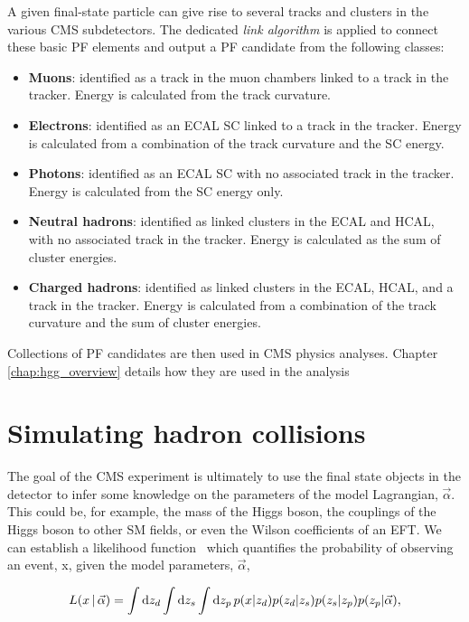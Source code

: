 A given final-state particle can give rise to several tracks and clusters in the various CMS subdetectors. The dedicated \textit{link algorithm} is applied to connect these basic PF elements and output a PF candidate from the following classes:
\begin{itemize}
    \item \textbf{Muons}: identified as a track in the muon chambers linked to a track in the tracker. Energy is calculated from the track curvature.
    \item \textbf{Electrons}: identified as an ECAL SC linked to a track in the tracker. Energy is calculated from a combination of the track curvature and the SC energy. 
    \item \textbf{Photons}: identified as an ECAL SC with no associated track in the tracker. Energy is calculated from the SC energy only.
    \item \textbf{Neutral hadrons}: identified as linked clusters in the ECAL and HCAL, with no associated track in the tracker. Energy is calculated as the sum of cluster energies.
    \item \textbf{Charged hadrons}: identified as linked clusters in the ECAL, HCAL, and a track in the tracker. Energy is calculated from a combination of the track curvature and the sum of cluster energies.
\end{itemize}
\noindent
Collections of PF candidates are then used in CMS physics analyses. Chapter \ref{chap:hgg_overview} details how they are used in the \Hgg analysis

\section{Simulating hadron collisions}\label{sec:mc}
The goal of the CMS experiment is ultimately to use the final state objects in the detector to infer some knowledge on the parameters of the model Lagrangian, $\vec{\alpha}$. This could be, for example, the mass of the Higgs boson, the couplings of the Higgs boson to other SM fields, or even the Wilson coefficients of an EFT. We can establish a likelihood function~\cite{Brehmer:2020cvb} which quantifies the probability of observing an event, x, given the model parameters, $\vec{\alpha}$,

\begin{equation}\label{eq:mc_integral}
    L(x\,|\,\vec{\alpha}) = \int {\rm{d}}z_d \int {\rm{d}}z_s \int {\rm{d}}z_p \, p(x|z_d)p(z_d|z_s)p(z_s|z_p)p(z_p|\vec{\alpha}),
\end{equation}

